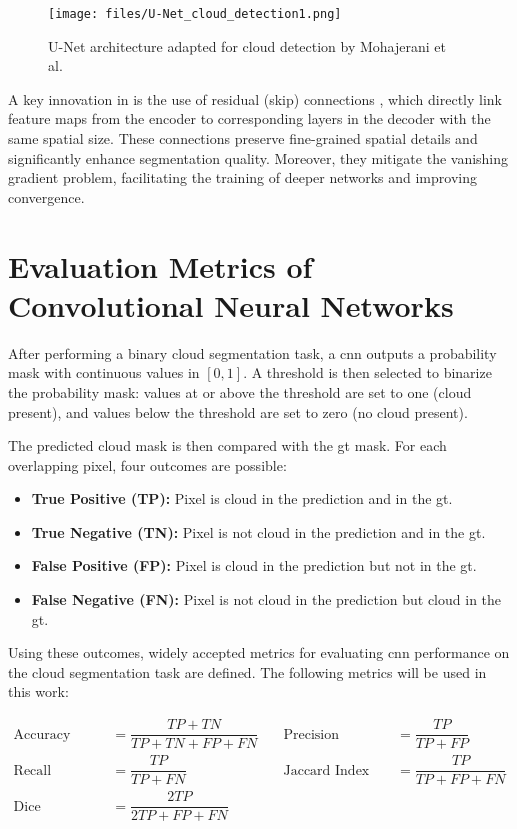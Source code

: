 {\begin{figure}[htbp]
  \centering
  \texttt{[image: files/U-Net\_cloud\_detection1.png]}
  \caption{U-Net architecture adapted for cloud detection by Mohajerani et al.~\cite{CloudNet2019}}
  \label{fig:unet-architecture}
\end{figure}


A key innovation in  is the use of residual (skip) connections \cite{he2015deepresiduallearningimage},
which directly link feature maps from the encoder to corresponding layers in the decoder with the same spatial size.
These connections preserve fine-grained spatial details and significantly enhance segmentation quality.
Moreover, they mitigate the vanishing gradient problem, facilitating the training of deeper networks and improving convergence.

\section{Evaluation Metrics of Convolutional Neural Networks}
\label{subsec:evalmetrics}

After performing a binary cloud segmentation task, a \gls{cnn} outputs a probability mask
with continuous values in \([0,1]\).
A threshold is then selected to binarize the probability mask:
values at or above the threshold are set to one (cloud present), and values below the threshold are set to zero (no cloud present).


The predicted cloud mask is then compared with the \gls{gt} mask.
For each overlapping pixel, four outcomes are possible:
\begin{itemize}
    \item \textbf{True Positive (TP):} Pixel is cloud in the prediction and in the \gls{gt}.
    \item \textbf{True Negative (TN):} Pixel is not cloud in the prediction and in the \gls{gt}.
    \item \textbf{False Positive (FP):} Pixel is cloud in the prediction but not in the \gls{gt}.
    \item \textbf{False Negative (FN):} Pixel is not cloud in the prediction but cloud in the \gls{gt}.
\end{itemize}

Using these outcomes, widely accepted metrics for evaluating \gls{cnn} performance on the cloud segmentation task are defined.
The following metrics will be used in this work:

\[
\begin{array}{llcl}
\text{Accuracy}  &= \dfrac{TP + TN}{TP + TN + FP + FN} 
& \quad \text{Precision} &= \dfrac{TP}{TP + FP} \\[1.2em]
\text{Recall}    &= \dfrac{TP}{TP + FN} 
& \quad \text{Jaccard Index (IoU)} &= \dfrac{TP}{TP + FP + FN} \\[1.2em]
\text{Dice Coefficient} &= \dfrac{2TP}{2TP + FP + FN} & &
\end{array}
\]

}
